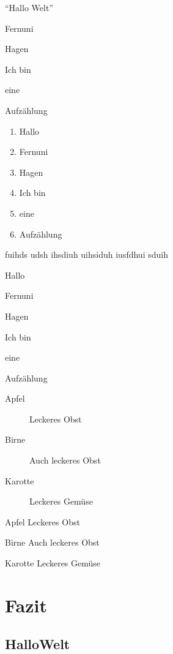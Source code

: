 \documentclass[12pt,ngerman,parskip=full]{scrreprt}
\begin{document}
\begin{compactitem}[$\Rightarrow$]
	\item \enquote{Hallo Welt}
	\item Fernuni
	\item Hagen
	\item Ich bin
	\item eine 
	\item Aufzählung
\end{compactitem}

\begin{enumerate}[I]
	\item Hallo 
	\item Fernuni
	\item Hagen
	\item Ich bin
	\item eine 
	\item Aufzählung
\end{enumerate}

fuihds udsh ihsdiuh uihsiduh iusfdhui sduih 

\begin{compactenum}[A)] \setcounter{enumi}{6}
	\item Hallo 
	\item Fernuni
	\item Hagen
	\item Ich bin
	\item eine 
	\item Aufzählung
\end{compactenum}

\begin{description}
\item[Apfel] Leckeres Obst
\item[Birne] Auch leckeres Obst
\item[Karotte] Leckeres Gemüse
\end{description}

\begin{compactdesc}
\item[Apfel] Leckeres Obst
\item[Birne] Auch leckeres Obst
\item[Karotte] Leckeres Gemüse
\end{compactdesc}


\chapter{Fazit}\label{cha:fazit}

\section{HalloWelt}\label{sec:hallo}
\end{document}
